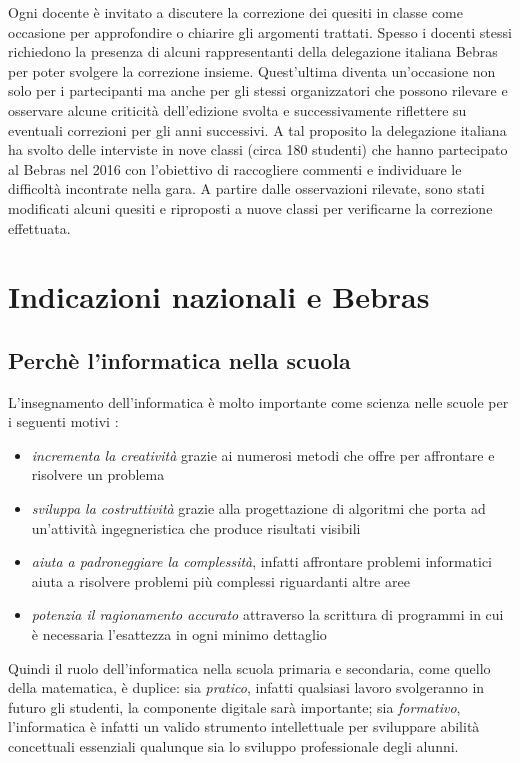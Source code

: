 \documentclass[12pt]{report}
\begin{document}
Ogni docente è invitato a discutere la correzione dei quesiti in classe  come occasione per approfondire o chiarire gli argomenti trattati. Spesso i docenti stessi richiedono la presenza di alcuni rappresentanti della delegazione italiana Bebras per poter svolgere la correzione insieme. Quest'ultima diventa un'occasione non solo per i partecipanti ma anche per gli stessi organizzatori che possono rilevare e osservare alcune criticità dell'edizione svolta e successivamente riflettere su eventuali correzioni per gli anni successivi.
A tal proposito la delegazione italiana ha svolto delle interviste \cite{LonatiKoli2017} in nove classi (circa 180 studenti) che hanno partecipato al Bebras nel 2016 con l'obiettivo di raccogliere commenti e individuare le difficoltà incontrate nella gara. 
A partire dalle osservazioni rilevate, sono stati modificati alcuni quesiti e riproposti a nuove classi per verificarne la correzione effettuata.


\chapter{Indicazioni nazionali e Bebras}
\label{cap2}
\section{Perchè l'informatica nella scuola}
L'insegnamento dell'informatica è molto importante come scienza nelle scuole per i seguenti motivi \cite{InformaticaScuola}:
\begin{itemize}
	\item \textit{incrementa la creatività} grazie ai numerosi metodi che offre per affrontare e risolvere un problema
	\item \textit{sviluppa la costruttività} grazie alla progettazione di algoritmi che porta ad un'attività ingegneristica che produce risultati visibili
	\item \textit{aiuta a padroneggiare la complessità}, infatti affrontare problemi informatici aiuta a risolvere problemi più complessi riguardanti altre aree
	\item \textit{potenzia il ragionamento accurato} attraverso la scrittura di programmi in cui è necessaria l'esattezza in ogni minimo dettaglio
\end{itemize}
Quindi il ruolo dell'informatica nella scuola primaria e secondaria, come quello della matematica, è duplice: sia \textit{pratico}, infatti qualsiasi lavoro svolgeranno in futuro gli studenti, la componente digitale sarà importante; sia \textit{formativo}, l'informatica è infatti un valido strumento intellettuale per sviluppare abilità concettuali essenziali qualunque sia lo sviluppo professionale degli alunni.
\end{document}
